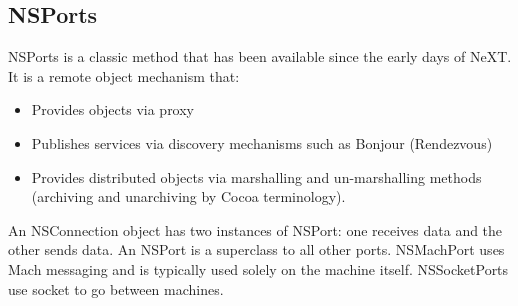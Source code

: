 \documentclass[11pt]{article}
\begin{document}
\newpage
\begin{Large}
\subsection {NSPorts} 
NSPorts is a classic method that has been available since the early days of NeXT.  It is a remote object mechanism that:
\begin{itemize}
\item Provides objects via proxy
\item Publishes services via discovery mechanisms such as Bonjour (Rendezvous)
\item Provides distributed objects via marshalling and un-marshalling methods (archiving and unarchiving by Cocoa terminology).
\end{itemize}




An NSConnection object has two instances of NSPort: one receives data and the other sends data.   An NSPort is a superclass to all other ports.  NSMachPort uses Mach messaging and is typically used solely on the machine itself.  NSSocketPorts use socket to go between machines.  


\end{Large}
\end{document}

